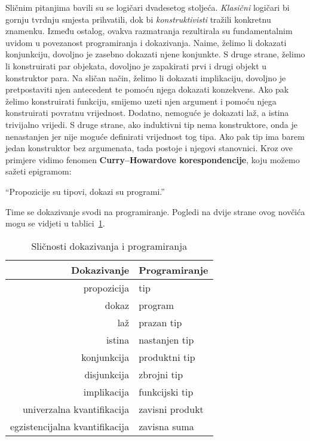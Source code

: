 Sličnim pitanjima bavili su se logičari dvadesetog stoljeća. \textit{Klasični} logičari bi gornju tvrdnju smjesta prihvatili,
dok bi \textit{konstruktivisti} tražili konkretnu znamenku.
Između ostalog, ovakva razmatranja rezultirala su fundamentalnim uvidom u povezanost programiranja i dokazivanja.
Naime, želimo li dokazati konjunkciju, dovoljno je zasebno dokazati njene konjunkte.
S druge strane, želimo li konstruirati par objekata, dovoljno je zapakirati prvi i drugi objekt u konstruktor para.
Na sličan način, želimo li dokazati implikaciju, dovoljno je pretpostaviti njen antecedent te pomoću njega dokazati konzekvens.
Ako pak želimo konstruirati funkciju, smijemo uzeti njen argument i pomoću njega konstruirati povratnu vrijednost.
Dodatno, nemoguće je dokazati laž, a istina trivijalno vrijedi.
S druge strane, ako induktivni tip nema konstruktore, onda je nenastanjen jer nije moguće definirati vrijednost tog tipa.
Ako pak tip ima barem jedan konstruktor bez argumenata, tada postoje i njegovi stanovnici.
Kroz ove primjere vidimo fenomen \textbf{Curry--Howardove korespondencije}, koju možemo sažeti epigramom:
\begin{displayquote}
  \enquote{Propozicije su tipovi, dokazi su programi.}
\end{displayquote}
\noindent Time se dokazivanje svodi na programiranje. Pogledi na dvije strane ovog novčića mogu se vidjeti u tablici~\ref{tab:curryhoward}.
\begin{table}[!hbt]
  \centering
  \begin{tabular}[!htb]{rl}
    \toprule
    Dokazivanje & Programiranje \\
    \midrule
    propozicija & tip \\
    dokaz & program \\
    laž & prazan tip \\
    istina & nastanjen tip \\    
    konjunkcija & produktni tip \\
    disjunkcija & zbrojni tip \\
    implikacija & funkcijski tip \\
    univerzalna kvantifikacija & zavisni produkt \\
    egzistencijalna kvantifikacija & zavisna suma \\
    \bottomrule
  \end{tabular}
  \caption{Sličnosti dokazivanja i programiranja}\label{tab:curryhoward}
\end{table}

